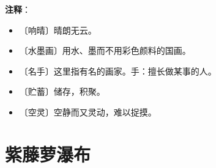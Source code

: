 \documentclass[12pt,UTF-8,openany]{ctexbook}
\begin{document}
\newpage

\textbf{注释}：

\vspace{-1em}

\begin{itemize}
    \setlength\itemsep{-0.2em}
    \item 〔响晴〕晴朗无云。
    \item 〔水墨画〕用水、墨而不用彩色颜料的国画。
    \item 〔名手〕这里指有名的画家。手：擅长做某事的人。
    \item 〔贮蓄〕储存，积聚。
    \item 〔空灵〕空静而又灵动，难以捉摸。
\end{itemize}

\chapter{紫藤萝瀑布}
\end{document}
